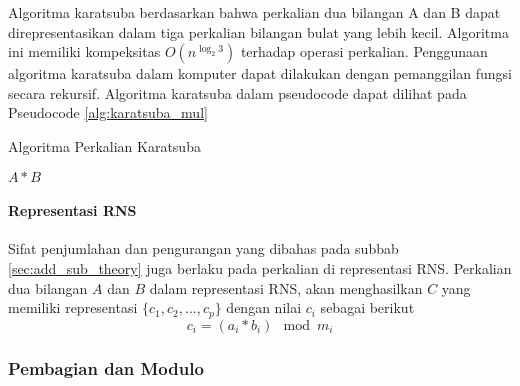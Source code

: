     Algoritma karatsuba berdasarkan bahwa perkalian dua bilangan A dan B dapat direpresentasikan dalam tiga perkalian bilangan bulat yang lebih kecil. Algoritma ini memiliki kompeksitas $O(n^{\log_2 3})$ terhadap operasi perkalian. Penggunaan algoritma karatsuba dalam komputer dapat dilakukan dengan pemanggilan fungsi secara rekursif. Algoritma karatsuba dalam pseudocode dapat dilihat pada Pseudocode \ref{alg:karatsuba_mul}

    \begin{algorithm}
      \caption{Algoritma Perkalian Karatsuba}
      \label{alg:karatsuba_mul}
      \begin{algorithmic}[1]
        \Statex
            \State \Return $A * B$
          \EndIf
          \State

          \State {}
        \EndFunction
      \end{algorithmic}
    \end{algorithm}


    \paragraph{Representasi RNS}
    Sifat penjumlahan dan pengurangan yang dibahas pada subbab \ref{sec:add_sub_theory} juga berlaku pada perkalian di representasi RNS. Perkalian dua bilangan $A$ dan $B$ dalam representasi RNS, akan menghasilkan $C$ yang memiliki representasi $\{c_1,c_2,...,c_p\}$ dengan nilai $c_i$ sebagai berikut
    \begin{equation}
        c_i = (a_i * b_i) \mod m_i
    \end{equation}

    \subsubsection{Pembagian dan Modulo}\label{sec:div_theory}

